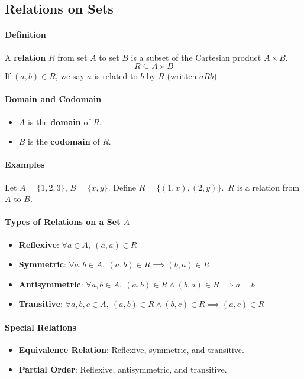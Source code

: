 \subsection{Relations on Sets}
\hrulefill

\paragraph*{Definition}
A \textbf{relation} $R$ from set $A$ to set $B$ is a subset of the Cartesian product $A \times B$.
\begin{equation*}
    R \subseteq A \times B
\end{equation*}
If $(a, b) \in R$, we say $a$ is related to $b$ by $R$ (written $aRb$).

\paragraph*{Domain and Codomain}
\begin{itemize}
    \item $A$ is the \textbf{domain} of $R$.
    \item $B$ is the \textbf{codomain} of $R$.
\end{itemize}

\paragraph*{Examples}
Let $A = \{1,2,3\}$, $B = \{x, y\}$. Define $R = \{(1, x), (2, y)\}$.\
$R$ is a relation from $A$ to $B$.

\paragraph*{Types of Relations on a Set $A$}
\begin{itemize}
    \item \textbf{Reflexive}: $\forall a \in A,\ (a,a) \in R$
    \item \textbf{Symmetric}: $\forall a,b \in A,\ (a,b) \in R \implies (b,a) \in R$
    \item \textbf{Antisymmetric}: $\forall a,b \in A,\ (a,b) \in R \land (b,a) \in R \implies a = b$
    \item \textbf{Transitive}: $\forall a,b,c \in A,\ (a,b) \in R \land (b,c) \in R \implies (a,c) \in R$
\end{itemize}

\paragraph*{Special Relations}
\begin{itemize}
    \item \textbf{Equivalence Relation}: Reflexive, symmetric, and transitive.
    \item \textbf{Partial Order}: Reflexive, antisymmetric, and transitive.
\end{itemize}

